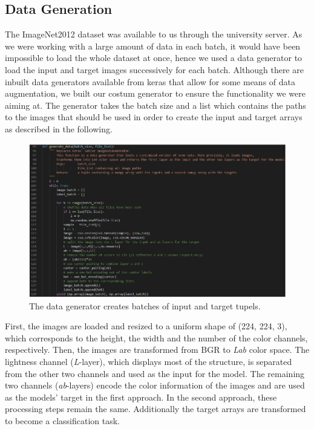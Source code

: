 \documentclass[12pt,letterpaper]{article}
\begin{document}
\subsection{Data Generation}
The ImageNet2012 dataset was available to us through the university server. As we were working with a large amount of data in each batch, it would have been impossible to load the whole dataset at once, hence we used a data generator to load the input and target images successively for each batch. Although there are inbuilt data generators available from keras that allow for some means of data augmentation, we built our costum generator to ensure the functionality we were aiming at. The generator takes the batch size and a list which contains the paths to the images that should be used in order to create the input and target arrays as described in the following.\\
\begin{figure}[h]
	\centering
	\includegraphics[width=1.0\textwidth]{code_datagen.png}
	\caption{The data generator creates batches of input and target tupels.}
	\label{datagen}
\end{figure}
First, the images are loaded and resized to a uniform shape of (224, 224, 3), which corresponds to the height, the width and the number of the color channels, respectively. Then, the images are transformed from BGR to \emph{Lab} color space. The lightness channel (\emph{L}-layer), which displays most of the structure, is separated from the other two channels and used as the input for the model. The remaining two channels (\emph{ab}-layers) encode the color information of the images and are used as the models’ target in the first approach. In the second approach, these processing steps remain the same. Additionally the target arrays are transformed to become a classification task.\\
\end{document}
